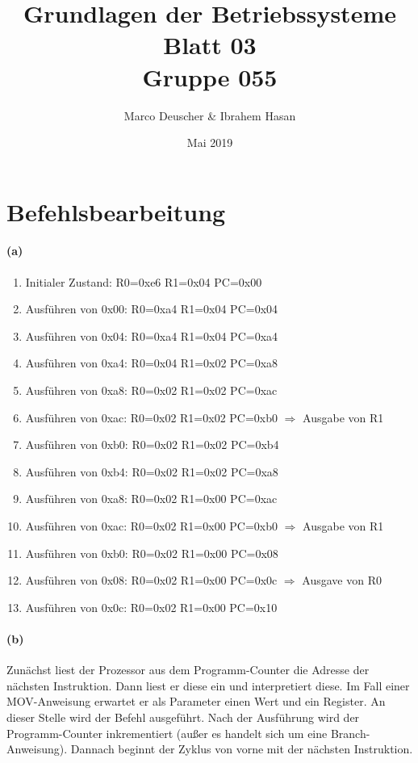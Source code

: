 \documentclass[a4paper]{article}
\title{Grundlagen der Betriebssysteme\\ Blatt 03 \\ Gruppe 055}
\author{Marco Deuscher & Ibrahem Hasan}
\date{Mai 2019}
\begin{document}
\maketitle

\section{Befehlsbearbeitung}
\paragraph{(a)}

\begin{enumerate}
	\item Initialer Zustand: R0=0xe6 R1=0x04 PC=0x00
	\item Ausführen von 0x00: R0=0xa4 R1=0x04 PC=0x04
	\item Ausführen von 0x04: R0=0xa4 R1=0x04 PC=0xa4 
	\item Ausführen von 0xa4: R0=0x04 R1=0x02 PC=0xa8
	\item Ausführen von 0xa8: R0=0x02 R1=0x02 PC=0xac
	\item Ausführen von 0xac: R0=0x02 R1=0x02 PC=0xb0 $\Rightarrow$ Ausgabe von R1
	\item Ausführen von 0xb0: R0=0x02 R1=0x02 PC=0xb4
	\item Ausführen von 0xb4: R0=0x02 R1=0x02 PC=0xa8
	\item Ausführen von 0xa8: R0=0x02 R1=0x00 PC=0xac
	\item Ausführen von 0xac: R0=0x02 R1=0x00 PC=0xb0 $\Rightarrow$ Ausgabe von R1
	\item Ausführen von 0xb0: R0=0x02 R1=0x00 PC=0x08
	\item Ausführen von 0x08: R0=0x02 R1=0x00 PC=0x0c $\Rightarrow$ Ausgave von R0
	\item Ausführen von 0x0c: R0=0x02 R1=0x00 PC=0x10
\end{enumerate}


\paragraph{(b)}
Zunächst liest der Prozessor aus dem Programm-Counter die Adresse der nächsten Instruktion. Dann liest er diese ein und interpretiert diese. Im Fall einer MOV-Anweisung erwartet er als Parameter einen Wert und ein Register. An dieser Stelle wird der Befehl ausgeführt. Nach der Ausführung wird der Programm-Counter inkrementiert (außer es handelt sich um eine Branch-Anweisung). Dannach beginnt der Zyklus von vorne mit der nächsten Instruktion.
\end{document}

